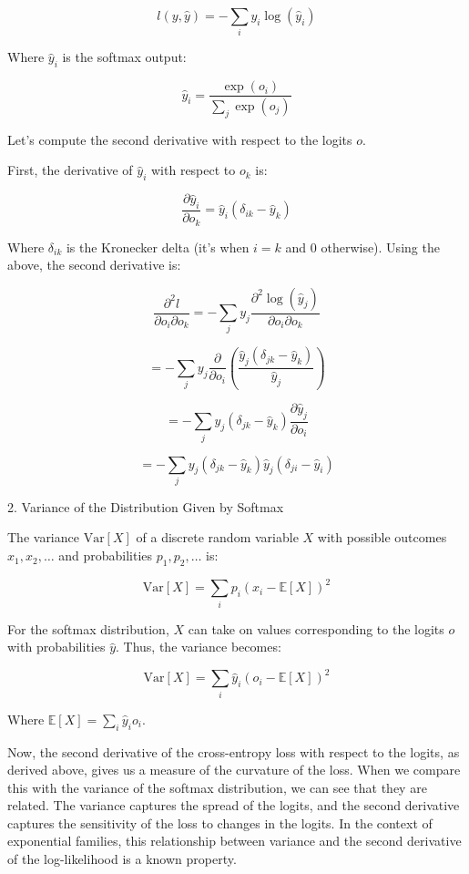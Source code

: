 \[ l(y, \hat{y}) = - \sum_{i} y_i \log(\hat{y}_i) \]

Where \( \hat{y}_i \) is the softmax output:

\[ \hat{y}_i = \frac{\exp(o_i)}{\sum_j \exp(o_j)} \]

Let's compute the second derivative with respect to the logits \( o \).

First, the derivative of \( \hat{y}_i \) with respect to \( o_k \) is:

\[ \frac{\partial \hat{y}_i}{\partial o_k} = \hat{y}_i (\delta_{ik} - \hat{y}_k) \]

Where \( \delta_{ik} \) is the Kronecker delta (it's when \( i = k \) and 0 otherwise).
Using the above, the second derivative is:

\[ \frac{\partial^2 l}{\partial o_i \partial o_k} = -\sum_j y_j \frac{\partial^2 \log(\hat{y}_j)}{\partial o_i \partial o_k} \]

\[ = -\sum_j y_j \frac{\partial}{\partial o_i} \left( \frac{\hat{y}_j (\delta_{jk} - \hat{y}_k)}{\hat{y}_j} \right) \]

\[ = -\sum_j y_j \left(\delta_{jk} - \hat{y}_k\right) \frac{\partial \hat{y}_j}{\partial o_i} \]

\[ = -\sum_j y_j \left(\delta_{jk} - \hat{y}_k\right) \hat{y}_j \left(\delta_{ji} - \hat{y}_i\right) \]

2. Variance of the Distribution Given by Softmax

The variance \( \textrm{Var}[X] \) of a discrete random variable \( X \) with possible outcomes \( x_1, x_2, \ldots \) and probabilities \( p_1, p_2, \ldots \) is:

\[ \textrm{Var}[X] = \sum_i p_i \left(x_i - \mathbb{E}[X]\right)^2 \]

For the softmax distribution, \( X \) can take on values corresponding to the logits \( o \) with probabilities \( \hat{y} \). Thus, the variance becomes:

\[ \textrm{Var}[X] = \sum_i \hat{y}_i \left(o_i - \mathbb{E}[X]\right)^2 \]

Where \( \mathbb{E}[X] = \sum_i \hat{y}_i o_i \).

Now, the second derivative of the cross-entropy loss with respect to the logits, as derived above, gives us a measure of the curvature of the loss.
When we compare this with the variance of the softmax distribution, we can see that they are related. The variance captures the spread of the logits, and the second derivative captures the sensitivity of the loss to changes in the logits. In the context of exponential families, this relationship between variance and the second derivative of the log-likelihood is a known property.

